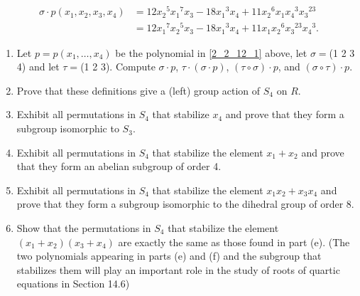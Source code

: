 \begin{enumerate}
                  \begin{align*}
                     \sigma \cdot p(x_1, x_2, x_3, x_4) &= 12{x_2}^5{x_1}^7x_3 -
                        18{x_1}^3x_4 + 11{x_2}^6x_1{x_4}^3{x_3}^{23} \\
                        &= 12{x_1}^7{x_2}^5x_3 -
                        18{x_1}^3x_4 + 11x_1{x_2}^6{x_3}^{23}{x_4}^3.
                  \end{align*}

                  \begin{enumerate}
                     \item Let $p = p(x_1, \ldots, x_4)$ be the polynomial in
                           \eqref{2_2_12_1} above, let $\sigma =$(1 2 3 4) and
                           let $\tau = $(1 2 3). Compute $\sigma \cdot p$,
                           $\tau \cdot (\sigma \cdot p)$,
                           $(\tau \circ \sigma) \cdot p$, and
                           $(\sigma \circ \tau) \cdot p$.
                     \item Prove that these definitions give a (left) group
                           action of $S_4$ on $R$.
                     \item Exhibit all permutations in $S_4$ that stabilize
                           $x_4$ and prove that they form a subgroup isomorphic
                           to $S_3$.
                     \item Exhibit all permutations in $S_4$ that stabilize the
                           element $x_1 + x_2$ and prove that they form an
                           abelian subgroup of order 4.
                     \item Exhibit all permutations in $S_4$ that stabilize the
                           element $x_1x_2 + x_3x_4$ and prove that they form a
                           subgroup isomorphic to the dihedral group of order 8.
                     \item Show that the permutations in $S_4$ that stabilize
                           the element $(x_1 + x_2)(x_3 + x_4)$ are exactly the
                           same as those found in part (e). (The two polynomials
                           appearing in parts (e) and (f) and the subgroup that
                           stabilizes them will play an important role in the
                           study of roots of quartic equations in Section 14.6)
                  \end{enumerate}

\end{enumerate}
